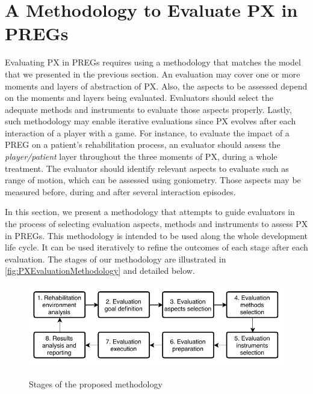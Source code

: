 \chapter{A Methodology to Evaluate PX in \acp{PREG}}
\label{ch:methodology}
Evaluating \ac{PX} in \acp{PREG} requires using a methodology that matches the model that we presented in the previous section. An evaluation may cover one or more moments and layers of abstraction of \ac{PX}. Also, the aspects to be assessed depend on the moments and layers being evaluated. Evaluators should select the adequate methods and instruments to evaluate those aspects properly. Lastly, such methodology may enable iterative evaluations since \ac{PX} evolves after each interaction of a player with a game. For instance, to evaluate the impact of a \ac{PREG} on a patient's rehabilitation process, an evaluator should assess the \textit{player/patient} layer throughout the three moments of \ac{PX}, during a whole treatment. The evaluator should identify relevant aspects to evaluate such as range of motion, which can be assessed using goniometry. Those aspects may be measured before, during and after several interaction episodes.

In this section, we present a methodology that attempts to guide evaluators in the process of selecting evaluation aspects, methods and instruments to assess \ac{PX} in \acp{PREG}. This methodology is intended to be used along the whole development life cycle. It can be used iteratively to refine the outcomes of each stage after each evaluation. The stages of our methodology are illustrated in \autoref{fig:PXEvaluationMethodology} and detailed below.

\begin{figure}[bth]
\myfloatalign
{\includegraphics[width=\linewidth]{gfx/methodology/PXEvaluationMethodology}} \quad
\caption{Stages of the proposed methodology}\label{fig:PXEvaluationMethodology}
\end{figure}

